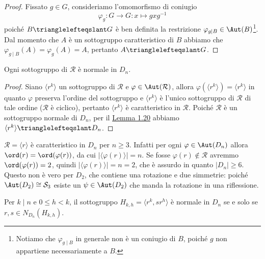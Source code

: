 \documentclass[11pt]{scrartcl}
\begin{document}
\begin{proof}
    Fissato $g \in G$, consideriamo l'omomorfismo di coniugio 
    \[
        \varphi_g : G\longrightarrow G : x\longmapsto gxg^{-1}
    \] poiché 
    $B\trianglelefteqslant G$ è ben definita la restrizione $\varphi_{g\mid B} \in \Aut(B)$\footnote{
        Notiamo che $\varphi_{g\mid B}$ in generale non è un 
        coniugio di $B$, poiché $g$ non appartiene necessariamente a $B$.
    }. 
    Dal momento che $A$ è
    un sottogruppo caratteristico di $B$ abbiamo che $\varphi_{g\mid B}(A) =
    \varphi_g(A) = A$,
    pertanto $A \trianglelefteqslant G$.
\end{proof}


\begin{corollary}
    Ogni sottogruppo di $\mathcal{R}$ è normale in $D_n$.
\end{corollary}

\begin{proof}
    Siano $\langle r^k\rangle$ un sottogruppo di $\mathcal{R}$ e $\varphi
    \in \Aut(\mathcal{R})$, allora $\varphi(\langle r^k\rangle) = \langle r^k\rangle$
    in quanto $\varphi$ preserva l'ordine del sottogruppo e $\langle r^k\rangle$
    è l'unico sottogruppo di $\mathcal{R}$ di tale ordine ($\mathcal{R}$ è ciclico),
    pertanto $\langle r^k\rangle$
    è caratteristico in $\mathcal{R}$. Poiché $\mathcal{R}$ è un sottogruppo
    normale di $D_n$, per il \hyperref[lemma1.20]{Lemma 1.20}
    abbiamo $\langle r^k\rangle\trianglelefteqslant D_n$.
\end{proof}

\begin{remark}
    $\mathcal{R} = \langle r \rangle$ è caratteristico in $D_n$ per $n \geqslant 3$.
    Infatti per ogni $\varphi \in \Aut(D_n)$ allora
    $\ord(r) = \ord(\varphi(r))$, da cui $|\langle\varphi(r)\rangle| = n$.
    Se fosse $\varphi(r) \notin \mathcal{R}$ avremmo $\ord(\varphi(r)) = 2$, 
    quindi $|\langle \varphi(r)\rangle| = n = 2$, che è assurdo in quanto $|D_n| \geqslant 6$.
    Questo non è vero per $D_2$, che contiene una rotazione e due
    simmetrie: poiché $\Aut(D_2) \cong \mathcal{S}_3$ esiste un $\psi \in \Aut(D_2)$ che manda 
    la rotazione in una riflessione.
\end{remark}

\begin{corollary}
    Per $k\mid n$ e $0\leq h < k$, il sottogruppo $H_{k, h} = \langle r^k, sr^h\rangle$
    è normale in $D_n$ se e solo se $r, s \in N_{D_n}(H_{k, h})$.
\end{corollary}
\end{document}
